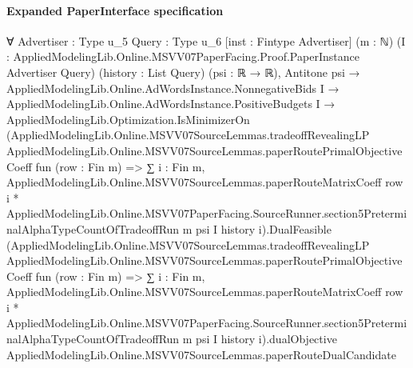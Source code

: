 \documentclass[10pt]{article}
\begin{document}
\paragraph{Expanded PaperInterface specification}
\begin{ReviewVerbatim}
∀ {Advertiser : Type u_5} {Query : Type u_6} [inst : Fintype Advertiser] (m : ℕ)
  (I : AppliedModelingLib.Online.MSVV07PaperFacing.Proof.PaperInstance Advertiser Query) (history : List Query)
  (psi : ℝ → ℝ),
  Antitone psi →
    AppliedModelingLib.Online.AdWordsInstance.NonnegativeBids I →
      AppliedModelingLib.Online.AdWordsInstance.PositiveBudgets I →
        AppliedModelingLib.Optimization.IsMinimizerOn
          (AppliedModelingLib.Online.MSVV07SourceLemmas.tradeoffRevealingLP
              AppliedModelingLib.Online.MSVV07SourceLemmas.paperRoutePrimalObjectiveCoeff fun (row : Fin m) =>
              ∑ i : Fin m,
                AppliedModelingLib.Online.MSVV07SourceLemmas.paperRouteMatrixCoeff row i *
                  AppliedModelingLib.Online.MSVV07PaperFacing.SourceRunner.section5PreterminalAlphaTypeCountOfTradeoffRun
                    m psi I history i).DualFeasible
          (AppliedModelingLib.Online.MSVV07SourceLemmas.tradeoffRevealingLP
              AppliedModelingLib.Online.MSVV07SourceLemmas.paperRoutePrimalObjectiveCoeff fun (row : Fin m) =>
              ∑ i : Fin m,
                AppliedModelingLib.Online.MSVV07SourceLemmas.paperRouteMatrixCoeff row i *
                  AppliedModelingLib.Online.MSVV07PaperFacing.SourceRunner.section5PreterminalAlphaTypeCountOfTradeoffRun
                    m psi I history i).dualObjective
          AppliedModelingLib.Online.MSVV07SourceLemmas.paperRouteDualCandidate
\end{ReviewVerbatim}
\end{document}
